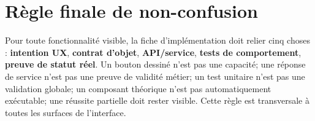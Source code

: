 \documentclass[11pt,a4paper]{article}
\begin{document}
\section{Règle finale de non-confusion}
Pour toute fonctionnalité visible, la fiche d'implémentation doit relier cinq choses : \textbf{intention UX}, \textbf{contrat d'objet}, \textbf{API/service}, \textbf{tests de comportement}, \textbf{preuve de statut réel}. Un bouton dessiné n'est pas une capacité; une réponse de service n'est pas une preuve de validité métier; un test unitaire n'est pas une validation globale; un composant théorique n'est pas automatiquement exécutable; une réussite partielle doit rester visible. Cette règle est transversale à toutes les surfaces de l'interface.
\end{document}
